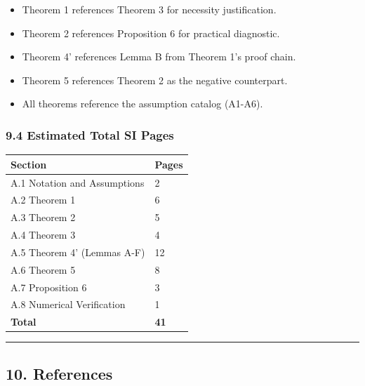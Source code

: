 \documentclass[
  12pt,
]{ctexart}
\providecommand{\tightlist}{%
  \setlength{\itemsep}{0pt}\setlength{\parskip}{0pt}}
\begin{document}
\begin{itemize}
\tightlist
\item
  Theorem 1 references Theorem 3 for necessity justification.
\item
  Theorem 2 references Proposition 6 for practical diagnostic.
\item
  Theorem 4' references Lemma B from Theorem 1's proof chain.
\item
  Theorem 5 references Theorem 2 as the negative counterpart.
\item
  All theorems reference the assumption catalog (A1-A6).
\end{itemize}

\subsubsection{9.4 Estimated Total SI
Pages}\label{estimated-total-si-pages}

\begin{longtable}[]{@{}ll@{}}
\toprule\noalign{}
Section & Pages \\
\midrule\noalign{}
\endhead
\bottomrule\noalign{}
\endlastfoot
A.1 Notation and Assumptions & 2 \\
A.2 Theorem 1 & 6 \\
A.3 Theorem 2 & 5 \\
A.4 Theorem 3 & 4 \\
A.5 Theorem 4' (Lemmas A-F) & 12 \\
A.6 Theorem 5 & 8 \\
A.7 Proposition 6 & 3 \\
A.8 Numerical Verification & 1 \\
\textbf{Total} & \textbf{41} \\
\end{longtable}

\begin{center}\rule{0.5\linewidth}{0.5pt}\end{center}

\subsection{10. References}\label{references}
\end{document}
